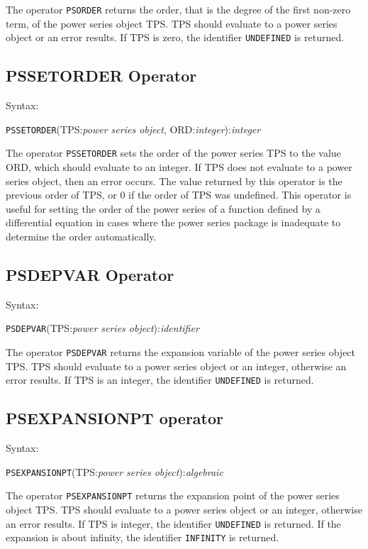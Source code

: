 \documentclass[11pt,letterpaper]{book}
\begin{document}
The operator {\tt PSORDER} returns the order, that is the degree of
the first non-zero term, of the power series object TPS.
TPS should evaluate to a power series object or an error results. If
TPS is zero, the identifier {\tt UNDEFINED} is returned.

\subsection{PSSETORDER Operator}

Syntax:

\hspace*{2em} {\tt PSSETORDER}(TPS:{\em power series object}, ORD:{\em integer}):{\em integer}

The operator {\tt PSSETORDER} sets the order of the power series TPS to the
value ORD, which should evaluate to an integer. If
TPS does not evaluate to a power series object, then an error
occurs. The value returned by this operator is the previous order of
TPS, or 0 if the order of TPS was undefined.  This
operator is useful for setting the order of the power series of a
function defined by a differential equation in cases where the power
series package is inadequate to determine the order automatically.


\subsection{PSDEPVAR Operator}

Syntax:

\hspace*{2em} {\tt PSDEPVAR}(TPS:{\em power series object}):{\em identifier}

The operator {\tt PSDEPVAR} returns the expansion variable of the
power series object TPS. TPS should evaluate to a power
series object or an integer, otherwise an error results. If TPS
is an integer, the identifier {\tt UNDEFINED} is returned.

\subsection{PSEXPANSIONPT operator}

Syntax:

\hspace*{2em} {\tt PSEXPANSIONPT}(TPS:{\em power series object}):{\em algebraic}

The operator {\tt PSEXPANSIONPT} returns the expansion point of the
power series object TPS. TPS should evaluate to a power
series object or an integer, otherwise an error results. If TPS
is integer, the identifier {\tt UNDEFINED} is returned. If the
expansion is about infinity, the identifier {\tt INFINITY} is
returned.
\end{document}
